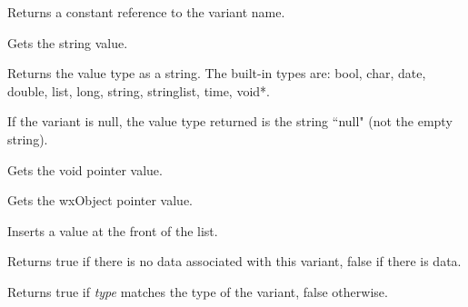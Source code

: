 \label{wxvariantgetname}


Returns a constant reference to the variant name.

\label{wxvariantgetstring}


Gets the string value.

\label{wxvariantgettype}


Returns the value type as a string. The built-in types are: bool, char, date, double, list, long, string, stringlist, time, void*.

If the variant is null, the value type returned is the string ``null" (not the empty string).

\label{wxvariantgetvoidptr}


Gets the void pointer value.

\label{wxvariantgetwxobjectptr}


Gets the wxObject pointer value.

\label{wxvariantinsert}


Inserts a value at the front of the list.

\label{wxvariantisnull}


Returns true if there is no data associated with this variant, false if there is data.

\label{wxvariantistype}


Returns true if {\it type} matches the type of the variant, false otherwise.

\label{wxvariantisvaluekindof}



